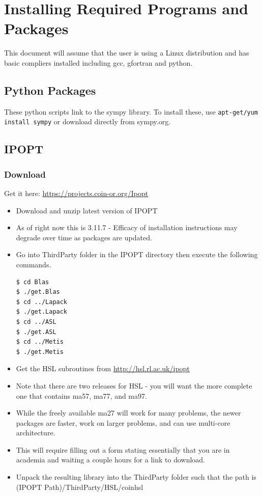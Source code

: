 \documentclass[11pt]{article}
\begin{document}
\section{Installing Required Programs and Packages}
This document will assume that the user is using a Linux distribution and has basic compliers installed including gcc, gfortran and python.
\subsection{Python Packages}
These python scripts link to the sympy library.  To install these, use \texttt{apt-get/yum install sympy} or download directly from sympy.org.
\subsection{IPOPT}
\subsubsection*{Download}
Get it here: \url{https://projects.coin-or.org/Ipopt}
\begin{itemize}
\item Download and unzip latest version of IPOPT 
\item As of right now this is 3.11.7 - Efficacy of installation instructions may degrade over time as packages are updated.
\item Go into ThirdParty folder in the IPOPT directory then execute the following commands.
\begin{verbatim}
$ cd Blas
$ ./get.Blas
$ cd ../Lapack
$ ./get.Lapack
$ cd ../ASL
$ ./get.ASL
$ cd ../Metis
$ ./get.Metis
\end{verbatim}
\item Get the HSL subroutines from \url{http://hsl.rl.ac.uk/ipopt}
\item Note that there are two releases for HSL - you will want the more complete one that contains ma57, ma77, and ma97. 
\item While the freely available ma27 will work for many problems, the newer packages are faster, work on larger problems, and can use multi-core architecture.
\item This will require filling out a form stating essentially that you are in academia and waiting a couple hours for a link to download.
\item Unpack the resulting library into the ThirdParty folder such that the path is (IPOPT Path)/ThirdParty/HSL/coinhsl
\end{itemize}
\end{document}

